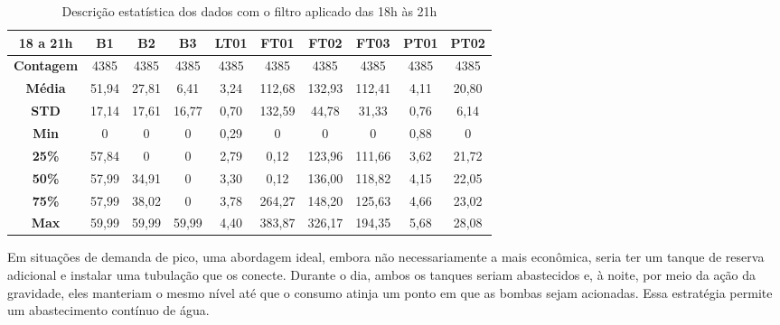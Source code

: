 \begin{table}[H]
	\centering
	\caption{Descrição estatística dos dados com o filtro aplicado das 18h às 21h}\label{tb:est}
	\begin{tabular}{@{}cccccccccc@{}}
		\toprule
		\textbf{18 a 21h}  & \textbf{B1} & \textbf{B2} & \textbf{B3} & \textbf{LT01} & \textbf{FT01} & \textbf{FT02} & \textbf{FT03} & \textbf{PT01} & \textbf{PT02} \\ \midrule
		\textbf{Contagem} & 4385    & 4385     & 4385     & 4385      & 4385       & 4385       & 4385       & 4385       & 4385       \\
		\textbf{Média}      & 51,94       & 27,81       & 6,41        & 3,24          & 112,68        & 132,93        & 112,41        & 4,11          & 20,80         \\
		\textbf{STD}       & 17,14       & 17,61       & 16,77       & 0,70          & 132,59        & 44,78         & 31,33         & 0,76          & 6,14          \\
		\textbf{Min}       & 0           & 0           & 0           & 0,29          & 0             & 0             & 0             & 0,88          & 0             \\
		\textbf{25\%}      & 57,84       & 0           & 0           & 2,79          & 0,12          & 123,96        & 111,66        & 3,62          & 21,72         \\
		\textbf{50\%}      & 57,99       & 34,91       & 0           & 3,30          & 0,12          & 136,00        & 118,82        & 4,15          & 22,05         \\
		\textbf{75\%}      & 57,99       & 38,02       & 0           & 3,78          & 264,27        & 148,20        & 125,63        & 4,66          & 23,02         \\
		\textbf{Max}       & 59,99       & 59,99       & 59,99       & 4,40          & 383,87        & 326,17        & 194,35        & 5,68          & 28,08         \\ \bottomrule
	\end{tabular}
	
	
\end{table}





Em situações de demanda de pico, uma abordagem ideal, embora não necessariamente a mais econômica, seria ter um tanque de reserva adicional e instalar uma tubulação que os conecte. Durante o dia, ambos os tanques seriam abastecidos e, à noite, por meio da ação da gravidade, eles manteriam o mesmo nível até que o consumo atinja um ponto em que as bombas sejam acionadas. Essa estratégia permite um abastecimento contínuo de água.


